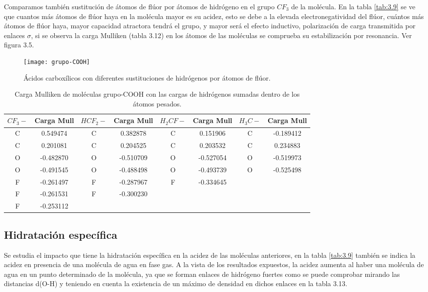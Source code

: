Comparamos también sustitución de átomos de flúor por átomos de hidrógeno en el grupo $CF_3$ de la molécula. En la tabla \ref{tab:3.9} se ve que cuantos más átomos de flúor haya en la molécula mayor es su acidez, esto se debe a la elevada electronegatividad del flúor, cuántos más átomos de flúor haya, mayor capacidad atractora tendrá el grupo, y mayor será el efecto inductivo, polarización de carga transmitida por enlaces $\sigma$, si se observa la carga Mulliken (tabla 3.12) en los átomos de las moléculas se comprueba su estabilización por resonancia. Ver figura 3.5.

\begin{figure}[H]
	\centering
	\texttt{[image: grupo-COOH]}
	\caption{Ácidos carboxílicos con diferentes sustituciones de hidrógenos por átomos de flúor.}
\end{figure}
\begin{table}[H]
    \centering
    \begin{tabular}{|c|c|c|c|c|c|c|c|}
    \hline
    $CF_3-$ & Carga Mull & $HCF_2-$ & Carga Mull & $H_2CF-$ & Carga Mull & $H_3C-$ & Carga Mull \\ \hline
     C & 0.549474 &  C & 0.382878 & C & 0.151906 & C & -0.189412 \\ \hline
     C & 0.201081 &  C & 0.204525 & C & 0.203532 & C & 0.234883 \\ \hline
     O & -0.482870 & O & -0.510709 & O & -0.527054 & O & -0.519973 \\ \hline
     O & -0.491545 & O & -0.488498 &  O & -0.493739 & O & -0.525498 \\ \hline
     F & -0.261497 & F & -0.287967 & F & -0.334645 &  & \\ \hline
     F & -0.261531 & F & -0.300230 &  &  &  & \\ \hline
     F & -0.253112 &  &  &  &  &  & \\ \hline
    \end{tabular}
    \caption{Carga Mulliken de moléculas grupo-COOH con las cargas de hidrógenos sumadas dentro de los átomos pesados.}
\end{table}

\subsection{Hidratación específica}
Se estudia el impacto que tiene la hidratación específica en la acidez de las moléculas anteriores, en la tabla \ref{tab:3.9} también se indica la acidez en presencia de una molécula de agua en fase gas.
A la vista de los resultados expuestos, la acidez aumenta al haber una molécula de agua en un punto determinado de la molécula, ya que se forman enlaces de hidrógeno fuertes como se puede comprobar mirando las distancias d(O-H) y teniendo en cuenta la existencia de un máximo de densidad en dichos enlaces en la tabla 3.13. 

